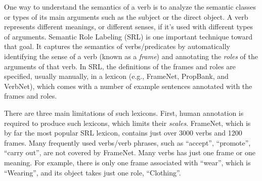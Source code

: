 One way to understand the semantics of a verb is to analyze
the semantic classes or types of its main arguments
such as the subject or the direct object. A verb represents different meanings,
or different senses, if it's used with different types of arguments.
%
Semantic Role Labeling (SRL) is one important technique toward that goal.
It captures the semantics of verbs/predicates by automatically identifying
the sense of a verb (known as a {\em frame}) and
annotating the {\em roles} of the arguments of that verb.
In SRL, the definitions of the frames
and roles are specified, usually manually, in a lexicon (e.g.,
FrameNet\cite{baker1998berkeley}, PropBank\cite{kingsbury2002treebank},
and VerbNet\cite{KipperDP00}), which comes with
a number of example sentences annotated with the frames and roles.

There are three main limitations of such lexicons.
First, human annotation is required to produce such lexicons,
which limits their {\em scales}.
FrameNet, which is by far the most popular SRL lexicon,
contains just over 3000 verbs and 1200 frames. %
Many frequently used verbs/verb phrases,
such as ``accept'', ``promote'', ``carry out'', are
not covered by FrameNet. Many verbs has just one frame or one meaning.
For example, there is only one frame associated with ``wear'',
which is ``Wearing'', and its object takes just one role,
``Clothing''.


